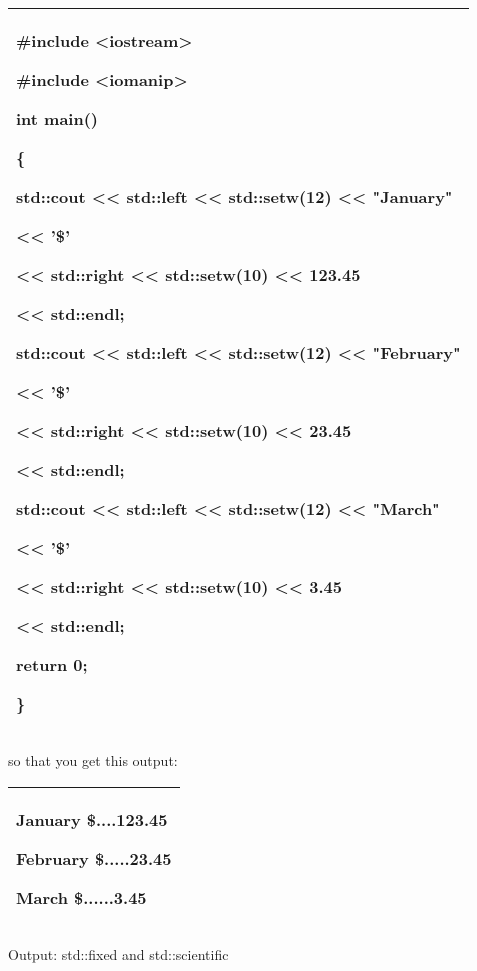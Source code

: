\documentclass[
]{article}
\begin{document}
\begin{longtable}[]{@{}l@{}}
\toprule
\endhead
\begin{minipage}[t]{0.97\columnwidth}\raggedright
\#include \textless iostream\textgreater{}

\#include \textless iomanip\textgreater{}

int main()

\{

std::cout \textless\textless{} std::left \textless\textless{}
std::setw(12) \textless\textless{} "January"

\textless\textless{} '\$'

\textless\textless{} std::right \textless\textless{} std::setw(10)
\textless\textless{} 123.45

\textless\textless{} std::endl;

std::cout \textless\textless{} std::left \textless\textless{}
std::setw(12) \textless\textless{} "February"

\textless\textless{} '\$'

\textless\textless{} std::right \textless\textless{} std::setw(10)
\textless\textless{} 23.45

\textless\textless{} std::endl;

std::cout \textless\textless{} std::left \textless\textless{}
std::setw(12) \textless\textless{} "March"

\textless\textless{} '\$'

\textless\textless{} std::right \textless\textless{} std::setw(10)
\textless\textless{} 3.45

\textless\textless{} std::endl;

return 0;

\}\strut
\end{minipage}\tabularnewline
\bottomrule
\end{longtable}

so that you get this output:

\begin{longtable}[]{@{}l@{}}
\toprule
\endhead
\begin{minipage}[t]{0.97\columnwidth}\raggedright
January \$....123.45

February \$.....23.45

March \$......3.45\strut
\end{minipage}\tabularnewline
\bottomrule
\end{longtable}

Output: std::fixed and std::scientific
\end{document}
